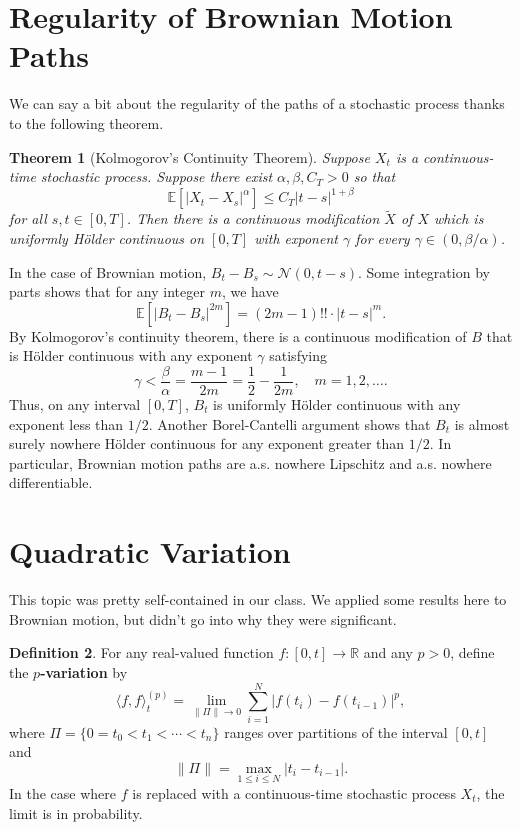 \documentclass[11pt,letterpaper]{article}
\newcommand{\reals}{\mathbb{R}}
\newcommand{\mcal}[1]{\mathcal{#1}}
\newcommand{\E}{\mathbb{E}}
\theoremstyle{plain}
\newtheorem{theorem}{Theorem}[section] %
\theoremstyle{definition}
\newtheorem{definition}[theorem]{Definition} %
\begin{document}
\section{Regularity of Brownian Motion Paths}
We can say a bit about the regularity of the paths of a stochastic process thanks to the following theorem.
\begin{theorem}[Kolmogorov's Continuity Theorem]
	Suppose $X_t$ is a continuous-time stochastic process. Suppose there exist $\alpha, \beta, C_T >0$ so that
	\[
	\E[|X_t-X_s|^\alpha]\leq C_T|t-s|^{1+\beta}
	\]
	for all $s,t\in [0,T]$. Then there is a continuous modification $\tilde{X}$ of $X$ which is uniformly H\"older continuous on $[0,T]$ with exponent $\gamma$ for every $\gamma\in (0, \beta/\alpha)$.
\end{theorem}

\noindent In the case of Brownian motion, $B_t - B_s\sim \mcal{N}(0, t-s)$. Some integration by parts shows that for any integer $m$, we have
\[
\E[|B_t - B_s|^{2m}] = (2m-1)!!\cdot |t-s|^m.
\]
By Kolmogorov's continuity theorem, there is a continuous modification of $B$ that is H\"older continuous with any exponent $\gamma$ satisfying
\[
\gamma<\frac{\beta}{\alpha} = \frac{m-1}{2m} = \frac{1}{2} - \frac{1}{2m},\quad m = 1, 2, \ldots.
\]
Thus, on any interval $[0,T]$, $B_t$ is uniformly H\"older continuous with any exponent less than $1/2$. Another Borel-Cantelli argument shows that $B_t$ is almost surely nowhere H\"older continuous for any exponent greater than $1/2$. In particular, Brownian motion paths are a.s. nowhere Lipschitz and a.s. nowhere differentiable.

\section{Quadratic Variation}
This topic was pretty self-contained in our class. We applied some results here to Brownian motion, but didn't go into why they were significant.
\begin{definition}
	For any real-valued function $f: [0, t]\to \reals$ and any $p>0$, define the \textbf{$p$-variation} by
	\[
	\langle f, f \rangle^{(p)}_t = \lim_{\|\Pi\|\to 0}\sum_{i=1}^N|f(t_i) - f(t_{i-1})|^p,
	\]
	where $\Pi = \{0 = t_0 < t_1 < \cdots < t_n\}$ ranges over partitions of the interval $[0, t]$ and
	\[
	\|\Pi\| = \max_{1\leq i\leq N}|t_i - t_{i-1}|.
	\]
	In the case where $f$ is replaced with a continuous-time stochastic process $X_t$, the limit is in probability.
\end{definition}
\end{document}
